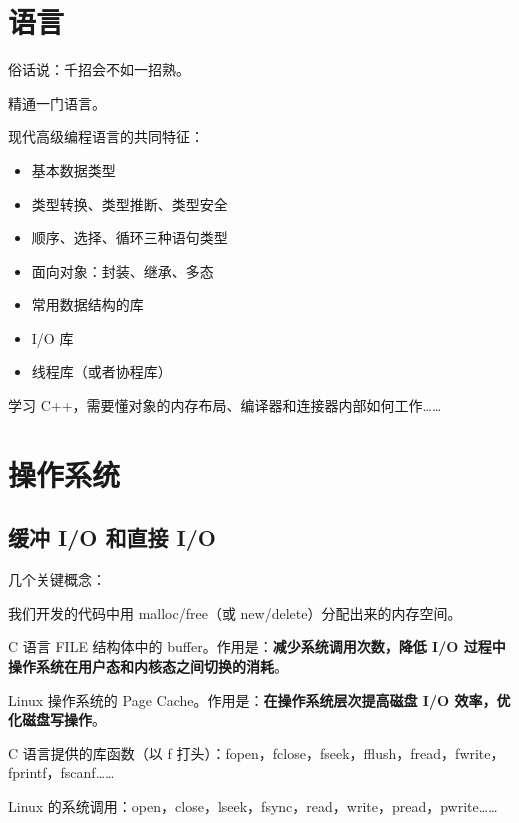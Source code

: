 \documentclass[cn,normal,11pt]{../elegantnote}
\begin{document}
\section{语言}
俗话说：千招会不如一招熟。

精通一门语言。

现代高级编程语言的共同特征：
\begin{itemize}
   \item 基本数据类型
   \item 类型转换、类型推断、类型安全
   \item 顺序、选择、循环三种语句类型
   \item 面向对象：封装、继承、多态
   \item 常用数据结构的库
   \item I/O 库
   \item 线程库（或者协程库）
\end{itemize}

\begin{note}
学习 C++，需要懂对象的内存布局、编译器和连接器内部如何工作……
\end{note}

\section{操作系统}

\subsection{缓冲 I/O 和直接 I/O}
几个关键概念：
\begin{definition}[应用程序内存]
   我们开发的代码中用 malloc/free（或 new/delete）分配出来的内存空间。
\end{definition}
\begin{definition}[用户缓冲区]
   C 语言 FILE 结构体中的 buffer。作用是：\textbf{减少系统调用次数，降低 I/O 过程中操作系统在用户态和内核态之间切换的消耗}。
\end{definition}
\begin{definition}[内核缓冲区]
   Linux 操作系统的 Page Cache。作用是：\textbf{在操作系统层次提高磁盘 I/O 效率，优化磁盘写操作}。
\end{definition}
\begin{definition}[缓冲 I/O]
   C 语言提供的库函数（以 f 打头）：fopen，fclose，fseek，fflush，fread，fwrite，fprintf，fscanf……
\end{definition}
\begin{definition}[直接 I/O]
   Linux 的系统调用：open，close，lseek，fsync，read，write，pread，pwrite……
\end{definition}
\end{document}
